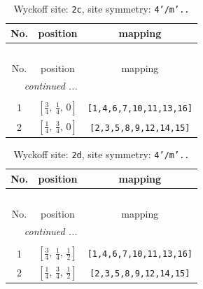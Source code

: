 \documentclass[fleqn,8pt]{jsarticle}
\begin{document}
\renewcommand{\arraystretch}{1.2}
\begin{longtable}{ccc}
\caption{Wyckoff site: {\tt 2c}, site symmetry: {\tt 4'/m'..}}
 \\
 \hline \hline
No. & position & mapping \\ \hline \endfirsthead

\multicolumn{2}{l}{\tablename\ \thetable{}} \\
 \hline \hline
No. & position & mapping \\ \hline \endhead

 \hline \hline
\multicolumn{2}{r}{\footnotesize\it continued ...} \\ \endfoot

 \hline \hline
\multicolumn{2}{r}{} \\ \endlastfoot

1 & $\left[ \frac{3}{4},\, \frac{1}{4},\, 0 \right]$ & {\tt [1,4,6,7,10,11,13,16]} \\ \hline
2 & $\left[ \frac{1}{4},\, \frac{3}{4},\, 0 \right]$ & {\tt [2,3,5,8,9,12,14,15]} \\
\end{longtable}
\renewcommand{\arraystretch}{1.2}
\begin{longtable}{ccc}
\caption{Wyckoff site: {\tt 2d}, site symmetry: {\tt 4'/m'..}}
 \\
 \hline \hline
No. & position & mapping \\ \hline \endfirsthead

\multicolumn{2}{l}{\tablename\ \thetable{}} \\
 \hline \hline
No. & position & mapping \\ \hline \endhead

 \hline \hline
\multicolumn{2}{r}{\footnotesize\it continued ...} \\ \endfoot

 \hline \hline
\multicolumn{2}{r}{} \\ \endlastfoot

1 & $\left[ \frac{3}{4},\, \frac{1}{4},\, \frac{1}{2} \right]$ & {\tt [1,4,6,7,10,11,13,16]} \\ \hline
2 & $\left[ \frac{1}{4},\, \frac{3}{4},\, \frac{1}{2} \right]$ & {\tt [2,3,5,8,9,12,14,15]} \\
\end{longtable}
\renewcommand{\arraystretch}{1.2}
\end{document}
